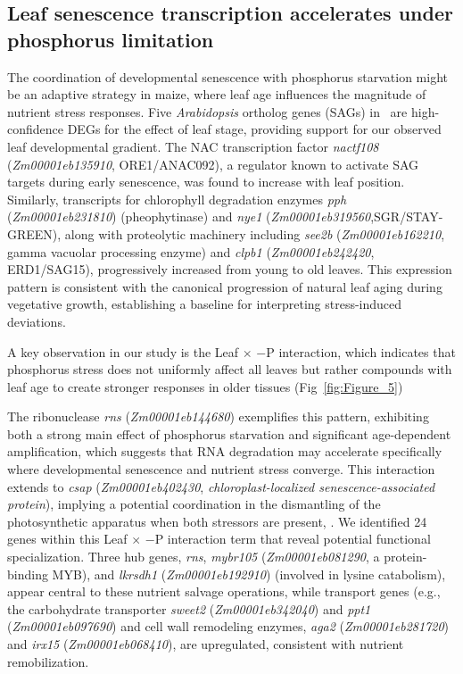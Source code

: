 \documentclass[9pt,twocolumn,twoside]{rilabRxiv}
\begin{document}
\subsection{Leaf senescence transcription accelerates under phosphorus limitation}

The coordination of developmental senescence with phosphorus starvation might be an adaptive strategy in maize, where leaf age influences the magnitude of nutrient stress responses. 
Five \textit{Arabidopsis} ortholog genes (SAGs) in~\cite{zhang2014c} are high-confidence DEGs for the effect of leaf stage, providing support for our observed leaf developmental gradient. 
The NAC transcription factor \textit{nactf108} (\textit{Zm00001eb135910}, ORE1/ANAC092), a regulator known to activate SAG targets during early senescence, was found to increase with leaf position. 
Similarly, transcripts for chlorophyll degradation enzymes \textit{pph} (\textit{Zm00001eb231810}) (pheophytinase) and \textit{nye1} (\textit{Zm00001eb319560},SGR/STAY-GREEN), along with proteolytic machinery including \textit{see2b} (\textit{Zm00001eb162210}, gamma vacuolar processing enzyme) and \textit{clpb1} (\textit{Zm00001eb242420}, ERD1/SAG15), progressively increased from young to old leaves. 
This expression pattern is consistent with the canonical progression of natural leaf aging during vegetative growth, establishing a baseline for interpreting stress-induced deviations.

A key observation in our study is the Leaf $\times$ $-$P interaction, which indicates that phosphorus stress does not uniformly affect all leaves but rather compounds with leaf age to create stronger responses in older tissues (Fig~\ref{fig:Figure_5})  

The ribonuclease \textit{rns} (\textit{Zm00001eb144680}) exemplifies this pattern, exhibiting both a strong main effect of phosphorus starvation and significant age-dependent amplification, which suggests that RNA degradation may accelerate specifically where developmental senescence and nutrient stress converge. 
This interaction extends to \textit{csap} (\textit{Zm00001eb402430}, \textit{chloroplast-localized senescence-associated protein}), implying a potential coordination in the dismantling of the photosynthetic apparatus when both stressors are present, \cite{so2020}. 
We identified 24 genes within this Leaf $\times$ $-$P interaction term that reveal potential functional specialization. 
Three hub genes, \textit{rns}, \textit{mybr105} (\textit{Zm00001eb081290}, a protein-binding MYB), and \textit{lkrsdh1} (\textit{Zm00001eb192910}) (involved in lysine catabolism), appear central to these nutrient salvage operations, while transport genes (e.g., the carbohydrate transporter \textit{sweet2} (\textit{Zm00001eb342040}) and \textit{ppt1} (\textit{Zm00001eb097690}) and cell wall remodeling enzymes, \textit{aga2} (\textit{Zm00001eb281720}) and \textit{irx15} (\textit{Zm00001eb068410}),  are upregulated, consistent with nutrient remobilization.
\end{document}
